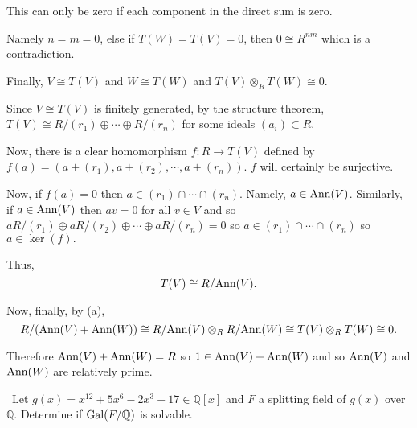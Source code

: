 \documentclass[12pt]{AlgebraQual}
\begin{document}
\begin{solution}
\begin{enumerate}[label=(\alph*)]
    This can only be zero if each component in the direct sum is zero.

    Namely $n=m=0$, else if $T(W)=T(V)=0$, then $0\cong R^{nm}$ which is a contradiction.

    Finally, $V\cong T(V)$ and $W\cong T(W)$ and $T(V)\otimes_R T(W)\cong 0$.

    Since $V\cong T(V)$ is finitely generated, by the structure theorem, $T(V)\cong R/(r_1)\oplus\cdots\oplus R/(r_n)$ for some ideals $(a_i)\subset R.$

    Now, there is a clear homomorphism $f:R\to T(V)$ defined by $f(a)=(a+(r_1),a+(r_2),\cdots,a+(r_n)).$ $f$ will certainly be surjective.

    Now, if $f(a)=0$ then $a\in(r_1)\cap\cdots\cap(r_n)$. Namely, $a\in\text{Ann}(V)$. Similarly, if $a\in\text{Ann}(V)$ then $av=0$ for all $v\in V$ and so $aR/(r_1)\oplus aR/(r_2)\oplus\cdots\oplus aR/(r_n)=0$ so $a\in(r_1)\cap\cdots\cap(r_n)$ so $a\in\ker(f).$

    Thus, $$T(V)\cong R/\text{Ann}(V).$$

    Now, finally, by (a), $$R/(\text{Ann}(V)+\text{Ann}(W))\cong R/\text{Ann}(V)\otimes_RR/\text{Ann}(W)\cong T(V)\otimes_RT(W)\cong 0.$$

    Therefore $\text{Ann}(V)+\text{Ann}(W)=R$ so $1\in \text{Ann}(V)+\text{Ann}(W)$ and so $\text{Ann}(V)$ and $\text{Ann}(W)$ are relatively prime.
\end{enumerate}
\end{solution}
\newpage




\begin{problem} $\,$
Let $g(x)=x^{12}+5x^6-2x^3+17\in\mathbb{Q}[x]$ and $F$ a splitting field of $g(x)$ over $\mathbb{Q}$. Determine if $\text{Gal}(F/\mathbb{Q})$ is solvable.
\end{problem}
\end{document}
